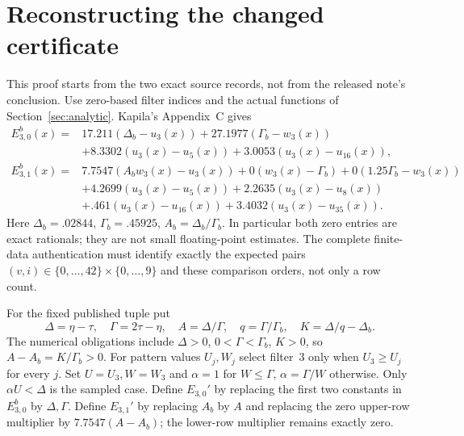 \section{Reconstructing the changed certificate}\label{sec:boundary}
This proof starts from the two exact source records, not from the
released note's conclusion. Use zero-based filter indices and the
actual functions of Section~\ref{sec:analytic}. Kapila's Appendix~C gives
\begin{align*}
 E_{3,0}^{b}(x)={}&17.211(\Delta_b-u_3(x))
  +27.1977(\Gamma_b-w_3(x))\\
 &+8.3302(u_3(x)-u_5(x))+3.0053(u_3(x)-u_{16}(x)),\\
 E_{3,1}^{b}(x)={}&7.7547(A_bw_3(x)-u_3(x))
  +0(w_3(x)-\Gamma_b)+0(1.25\Gamma_b-w_3(x))\\
 &+4.2699(u_3(x)-u_5(x))+2.2635(u_3(x)-u_8(x))\\
 &+.461(u_3(x)-u_{16}(x))+3.4032(u_3(x)-u_{35}(x)).
\end{align*}
Here $\Delta_b=.02844$, $\Gamma_b=.45925$, $A_b=\Delta_b/\Gamma_b$.
In particular both zero entries are exact rationals; they are not small
floating-point estimates. The complete finite-data authentication must
identify exactly the expected pairs $(v,i)\in\{0,\ldots,42\}\times
\{0,\ldots,9\}$ and these comparison orders, not only a row count.

For the fixed published tuple put
\[
 \Delta=\eta-\tau,\quad\Gamma=2\tau-\eta,\quad
 A=\Delta/\Gamma,\quad q=\Gamma/\Gamma_b,\quad
 K=\Delta/q-\Delta_b.
\]
The numerical obligations include $\Delta>0$, $0<\Gamma<\Gamma_b$,
$K>0$, so $A-A_b=K/\Gamma_b>0$.
For pattern values $U_j,W_j$ select filter~3 only when $U_3\ge U_j$
for every $j$. Set $U=U_3,W=W_3$ and
$\alpha=1$ for $W\le\Gamma$, $\alpha=\Gamma/W$ otherwise.
Only $\alpha U<\Delta$ is the sampled case.
Define $E_{3,0}'$ by replacing the first two constants in $E_{3,0}^b$
by $\Delta,\Gamma$. Define $E_{3,1}'$ by replacing $A_b$ by $A$
and replacing the zero upper-row multiplier by $7.7547(A-A_b)$;
the lower-row multiplier remains exactly zero.

